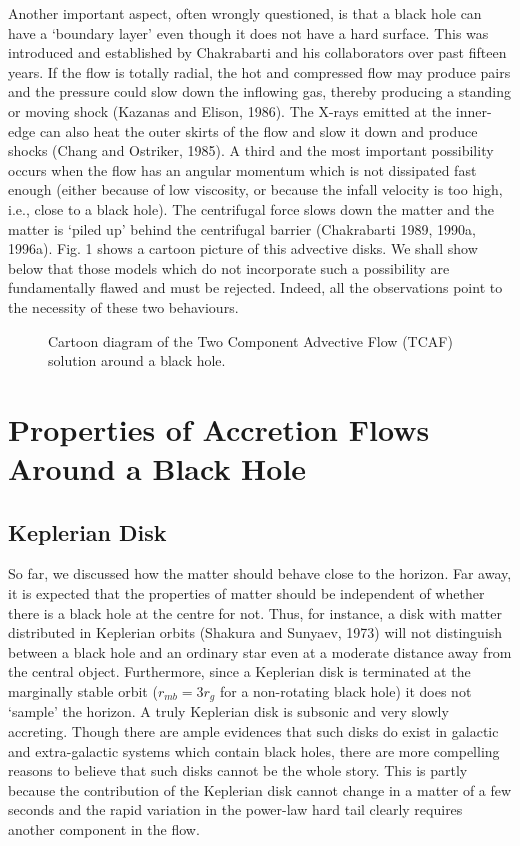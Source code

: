 \documentclass{ws-procs975x65}
\begin{document}
Another important aspect, often wrongly questioned, is that a black hole can have a `boundary layer'
even though it does not have a hard surface. This was introduced and established by Chakrabarti
and his collaborators over past fifteen years. If the flow is totally radial, the hot and compressed flow
may produce pairs and the pressure could slow down the inflowing gas, thereby producing a standing or moving shock
(Kazanas and Elison, 1986). The X-rays emitted at the inner-edge can also heat the outer skirts of the
flow and slow it down and produce shocks (Chang and Ostriker, 1985). A third and the most important possibility
occurs when the flow has an angular momentum  which is not dissipated fast enough  (either because of 
low viscosity, or because the infall velocity is too high, i.e., close to a black hole). The centrifugal
force slows down the matter and the matter is `piled up' behind the centrifugal barrier (Chakrabarti 1989, 1990a,
1996a). Fig. 1 shows a cartoon picture of this advective disks.
We shall show below that those models which do not incorporate such a possibility are fundamentally 
flawed and must be rejected. Indeed, all the observations point to the necessity of these two behaviours.

\begin{figure}[t]
\vskip 0.0cm
\centerline{\epsfxsize=5.5in}
\vskip -1.2cm
\caption{Cartoon diagram of the Two Component Advective Flow  (TCAF) solution around a black hole.} 
\end{figure}

\section{Properties of Accretion Flows Around a Black Hole} 

\subsection{Keplerian Disk}

So far, we discussed how the matter should behave close to the horizon. Far away, it is expected that 
the properties of matter should be independent of whether there is a black hole at the centre for not.  
Thus, for instance, a disk with matter distributed in Keplerian orbits (Shakura and Sunyaev, 1973)
will not distinguish between a black hole and an ordinary star even at a moderate distance away from the
central object. Furthermore, since a Keplerian disk is terminated at the marginally stable orbit
($r_{mb}=3r_g$ for a non-rotating black hole) it does not `sample' the horizon. A truly Keplerian disk
is subsonic and  very slowly accreting. Though there are ample evidences that such disks do exist
in galactic and extra-galactic systems which contain black holes, there are more compelling reasons to believe that 
such disks cannot be the whole story. This is partly because the contribution of the Keplerian disk cannot
change in a matter of a few seconds and the rapid variation in the power-law hard tail clearly requires
another component in the flow. 
\end{document}
